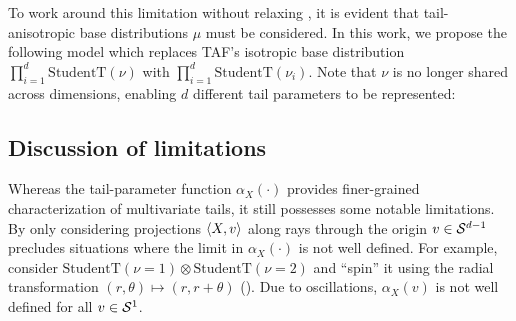 \documentclass{article}
\theoremstyle{definition}
\newtheorem{definition}[theorem]{Definition}
\theoremstyle{remark}
\newtheorem{remark}[theorem]{Remark}
\begin{document}
To work around this limitation without relaxing , it is evident
that tail-anisotropic base distributions $\mu$ must be considered. In this work, we propose
the following model which replaces TAF's isotropic base distribution $\prod_{i=1}^d \text{StudentT}(\nu)$
with $\prod_{i=1}^d \text{StudentT}(\nu_i)$. Note that $\nu$ is no longer shared across dimensions,
enabling $d$ different tail parameters to be represented:





\vspace{-2mm}
\subsection{Discussion of limitations}
\label{ssec:limitations}

\vspace{-1mm}
Whereas the tail-parameter function $\alpha_X(\cdot)$ provides finer-grained characterization
of multivariate tails, it still possesses some notable limitations.
By only considering projections $\braket{X,v}$ along rays through the origin
$v \in \mathcal{S}^{d-1}$ precludes situations where the limit in $\alpha_X(\cdot)$ is not well defined.
For example, consider $\text{StudentT}(\nu=1) \otimes \text{StudentT}(\nu=2)$ and ``spin'' it
using the radial transformation $(r,\theta) \mapsto (r,r+\theta)$ (). Due to
oscillations, $\alpha_X(v)$ is not well defined for all $v \in \mathcal{S}^{1}$. 
\end{document}
